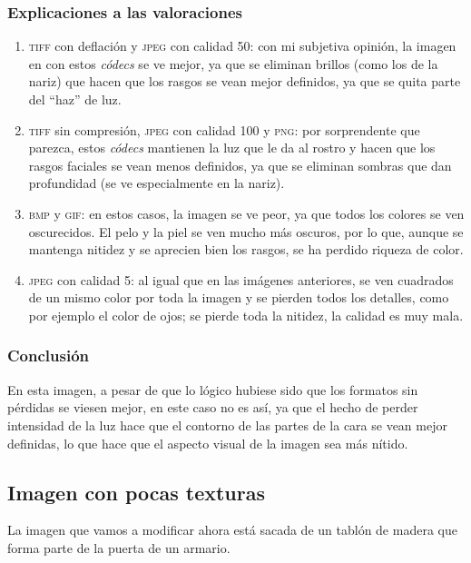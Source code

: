 \documentclass[11pt,a4paper]{article}
\begin{document}
\subsubsection{Explicaciones a las valoraciones}
\begin{enumerate}
	\item \textsc{tiff} con deflación y \textsc{jpeg} con calidad 50: con mi subjetiva opinión, la imagen en con estos \textit{códecs} se ve mejor, ya que se eliminan brillos (como los de la nariz) que hacen que los rasgos se vean mejor definidos, ya que se quita parte del ``haz'' de luz.
	\item \textsc{tiff} sin compresión, \textsc{jpeg} con calidad 100 y \textsc{png}: por sorprendente que parezca, estos \textit{códecs} mantienen la luz que le da al rostro y hacen que los rasgos faciales se vean menos definidos, ya que se eliminan sombras que dan profundidad (se ve especialmente en la nariz).
	\item \textsc{bmp} y \textsc{gif}: en estos casos, la imagen se ve peor, ya que todos los colores se ven oscurecidos. El pelo y la piel se ven mucho más oscuros, por lo que, aunque se mantenga nitidez y se aprecien bien los rasgos, se ha perdido riqueza de color.
	\item \textsc{jpeg} con calidad 5: al igual que en las imágenes anteriores, se ven cuadrados de un mismo color por toda la imagen y se pierden todos los detalles, como por ejemplo el color de ojos; se pierde toda la nitidez, la calidad es muy mala.
\end{enumerate}

\subsubsection{Conclusión}

En esta imagen, a pesar de que lo lógico hubiese sido que los formatos sin pérdidas se viesen mejor, en este caso no es así, ya que el hecho de perder intensidad de la luz hace que el contorno de las partes de la cara se vean mejor definidas, lo que hace que el aspecto visual de la imagen sea más nítido.

\newpage

\subsection{Imagen con pocas texturas}

La imagen que vamos a modificar ahora está sacada de un tablón de madera que forma parte de la puerta de un armario.
\end{document}
